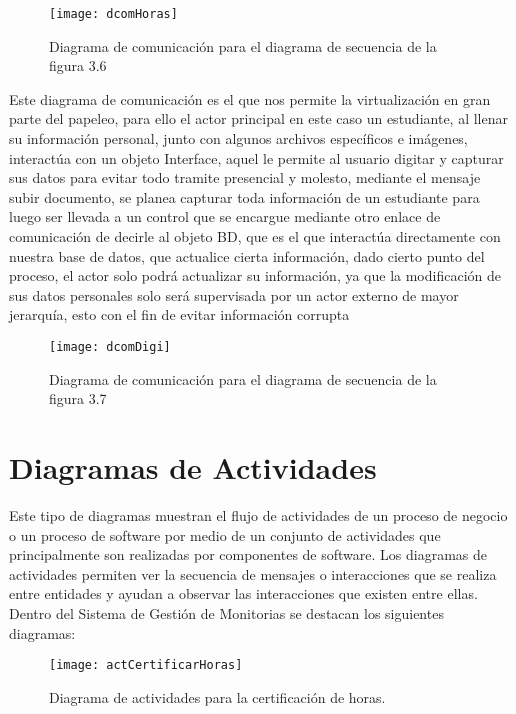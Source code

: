 \begin{figure}[H]
	\centering
	\texttt{[image: dcomHoras]}
    \centering
    \caption{Diagrama de comunicación para el diagrama de secuencia de la figura 3.6}
	\label{fig:dcomHoras}
\end{figure}
\clearpage
Este diagrama de comunicación es el que nos permite la virtualización en gran parte del papeleo, para ello el actor principal en este caso un estudiante, al llenar su información personal, junto con algunos archivos específicos e imágenes, interactúa con un objeto Interface, aquel le permite al usuario digitar y capturar sus datos para evitar todo tramite presencial y molesto, mediante el mensaje subir documento, se planea capturar toda información de un estudiante para luego ser llevada a un control que se encargue mediante otro enlace de comunicación de decirle al objeto BD, que es el que interactúa directamente con nuestra base de datos, que actualice cierta información, dado cierto punto del proceso, el actor solo podrá actualizar su información, ya que la modificación de sus datos personales solo será supervisada por un actor externo de mayor jerarquía, esto con el fin de evitar información corrupta
\begin{figure}[H]
	\centering
	\texttt{[image: dcomDigi]}
    \centering
    \caption{Diagrama de comunicación para el diagrama de secuencia de la figura 3.7}
	\label{fig:dcomDigi}
\end{figure}
\clearpage

\newpage


\section{Diagramas de Actividades}
Este tipo de diagramas muestran el flujo de actividades de un proceso de negocio o un proceso de software por medio de un conjunto de actividades que principalmente son realizadas por componentes de software. Los diagramas de actividades permiten ver la secuencia de mensajes o interacciones que se realiza entre entidades y ayudan a observar las interacciones que existen entre ellas.
Dentro del Sistema de Gestión de Monitorias se destacan los siguientes diagramas:

\begin{figure}[H]
	\centering
	\texttt{[image: actCertificarHoras]}
	\centering
	\caption{Diagrama de actividades para la certificación de horas.}
	\label{fig:actCertificarHoras}
\end{figure}


